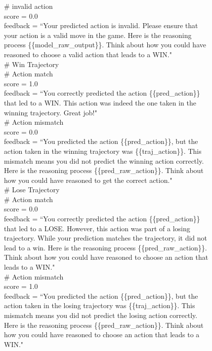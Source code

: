 \begin{figure}[H]
\centering

\begin{tcolorbox}[
    colback=blue!5!white,
    colframe=blue!40!white,
    left=1mm, right=1mm, top=1mm, bottom=1mm,
    width=\textwidth,
    enhanced,
    attach boxed title to top center={yshift=-2mm},
    boxed title style={colback=blue!40!white},
    title={GEPA scoring standard},
    label=box:gepa_scoring
]
\# invalid action \\
score = 0.0 \\
feedback = ``Your predicted action is invalid. Please ensure that your action is a valid move in the game. Here is the reasoning process \{\{model\_raw\_output\}\}. Think about how you could have reasoned to choose a valid action that leads to a WIN."\\

\# Win Trajectory \\
\# Action match \\
score = 1.0 \\
feedback = ``You correctly predicted the action \{\{pred\_action\}\} that led to a WIN. This action was indeed the one taken in the winning trajectory. Great job!" \\

\# Action mismatch \\
score = 0.0 \\
feedback = ``You predicted the action \{\{pred\_action\}\}, but the action taken in the winning trajectory was \{\{traj\_action\}\}. This mismatch means you did not predict the winning action correctly. Here is the reasoning process \{\{pred\_raw\_action\}\}. Think about how you could have reasoned to get the correct action." \\

\# Lose Trajectory \\
\# Action match \\
score = 0.0 \\
feedback = ``You correctly predicted the action \{\{pred\_action\}\} that led to a LOSE. However, this action was part of a losing trajectory. While your prediction matches the trajectory, it did not lead to a win. Here is the reasoning process \{\{pred\_raw\_action\}\}. Think about how you could have reasoned to choose an action that leads to a WIN." \\

\# Action mismatch \\
score = 1.0 \\
feedback = ``You predicted the action \{\{pred\_action\}\}, but the action taken in the losing trajectory was \{\{traj\_action\}\}. This mismatch means you did not predict the losing action correctly. Here is the reasoning process \{\{pred\_raw\_action\}\}. Think about how you could have reasoned to choose an action that leads to a WIN." \\


\end{tcolorbox}
\end{figure}
